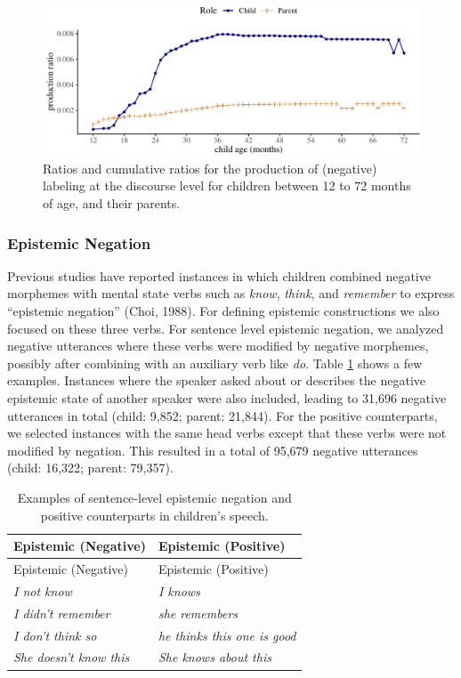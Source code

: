 \documentclass[
  english,
  man,floatsintext]{apa6}
\begin{document}
\begin{figure}[H]

{\centering \includegraphics{neg_construction_article_files/figure-latex/learningdiscourse-1} 

}

\caption{Ratios and cumulative ratios for the production of (negative) labeling at the discourse level for children between 12 to 72 months of age, and their parents.}\label{fig:learningdiscourse}
\end{figure}

\hypertarget{epistemic-negation}{%
\subsubsection{Epistemic Negation}\label{epistemic-negation}}

Previous studies have reported instances in which children combined negative morphemes with mental state verbs such as \emph{know}, \emph{think}, and \emph{remember} to express ``epistemic negation'' (Choi, 1988). For defining epistemic constructions we also focused on these three verbs. For sentence level epistemic negation, we analyzed negative utterances where these verbs were modified by negative morphemes, possibly after combining with an auxiliary verb like \emph{do}. Table \ref{tab:epistem} shows a few examples. Instances where the speaker asked about or describes the negative epistemic state of another speaker were also included, leading to 31,696 negative utterances in total (child: 9,852; parent: 21,844). For the positive counterparts, we selected instances with the same head verbs except that these verbs were not modified by negation. This resulted in a total of 95,679 negative utterances (child: 16,322; parent: 79,357).

\begin{longtable}[]{@{}ll@{}}
\caption{\label{tab:epistem} Examples of sentence-level epistemic negation and positive counterparts in children's speech.}\tabularnewline
\toprule
Epistemic (Negative) & Epistemic (Positive) \\
\midrule
\endfirsthead
\toprule
Epistemic (Negative) & Epistemic (Positive) \\
\midrule
\endhead
\emph{I not know} & \emph{I knows} \\
\emph{I didn't remember} & \emph{she remembers} \\
\emph{I don't think so} & \emph{he thinks this one is good} \\
\emph{She doesn't know this} & \emph{She knows about this} \\
\bottomrule
\end{longtable}
\end{document}

